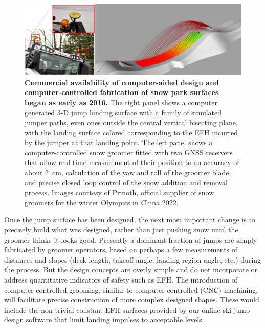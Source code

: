 \documentclass[smallextended]{svjour3}       %
\begin{document}
%
\begin{figure}
  \centering
  \includegraphics[width=\columnwidth]{figures/prinoth.png}
  \caption{\textbf{Commercial availability of computer-aided design and computer-controlled fabrication of snow park surfaces began as early as 2016.} The right panel shows a computer generated 3-D jump landing surface with a family of simulated jumper paths, even ones outside the central vertical bisecting plane, with the landing surface colored corresponding to the EFH incurred by the jumper at that landing point. The left panel shows a computer-controlled snow groomer fitted with two GNSS receivers that allow real time measurement of their position to an accuracy of about 2~\si{\centi\meter}, calculation of the yaw and roll of the groomer blade, and precise closed loop control of the snow addition and removal process. 
  Images courtesy of Prinoth, official supplier of snow groomers for the winter Olympics in China 2022.}
  \label{fig:prinoth}
\end{figure}

Once the jump surface has been designed, the next most important change is to precisely build what was designed, rather than just pushing snow until the groomer thinks it looks good. Presently a dominant fraction of jumps are simply fabricated by groomer operators, based on perhaps a few measurements of distances and slopes (deck length, takeoff angle, landing region angle, etc.) during the process. But the design concepts are overly simple and do not incorporate or address quantitative indicators of safety such as EFH. The introduction of computer controlled grooming, similar to computer controlled (CNC) machining, will facilitate precise construction of more complex designed shapes. These would include the non-trivial constant EFH surfaces provided by our online ski jump design software that limit landing impulses to acceptable levels. 
\end{document}

